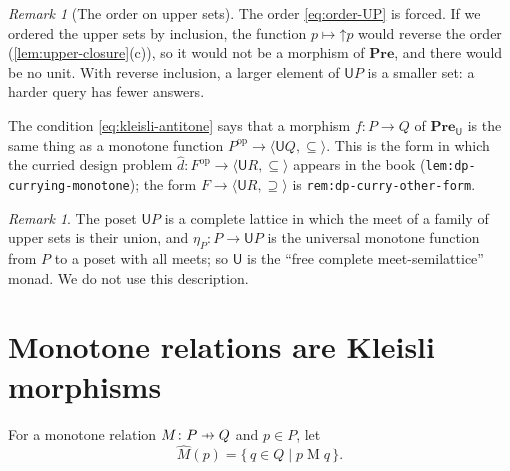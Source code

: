 \documentclass[11pt,a4paper]{article}
\theoremstyle{plain}
\theoremstyle{definition}
\theoremstyle{remark}
\newtheorem{remark}[theorem]{Remark}
\newcommand{\Cat}[1]{\mathbf{#1}}
\newcommand{\Pre}{\Cat{Pre}}
\newcommand{\U}{\mathsf{U}}
\newcommand{\PreU}{\Pre_{\U}}
\newcommand{\tup}[1]{\langle #1 \rangle}
\newcommand{\profto}{\mathrel{\ooalign{\hfil$\mapstochar\mkern 5mu$\hfil\cr$\to$\cr}}}
\newcommand{\rel}[3]{#1 \mathrel{#2} #3}
\newcommand{\up}{\mathord{\uparrow}}
\newcommand{\op}{^{\mathrm{op}}}
\newcommand{\lbl}[1]{\nolinkurl{#1}}
\begin{document}
\begin{remark}[The order on upper sets]
    \label{rem:order}
    The order \cref{eq:order-UP} is forced.
    If we ordered the upper sets by inclusion, the function $p \mapsto \up p$ would reverse the order (\cref{lem:upper-closure}(c)), so it would not be a morphism of $\Pre$, and there would be no unit.
    With reverse inclusion, a larger element of $\U P$ is a smaller set: a harder query has fewer answers.

    The condition \cref{eq:kleisli-antitone} says that a morphism $f \colon P \to Q$ of $\PreU$ is the same thing as a monotone function $P\op \to \tup{\U Q, \subseteq}$.
    This is the form in which the curried design problem $\widehat{d} \colon F\op \to \tup{\U R, \subseteq}$ appears in the book (\lbl{lem:dp-currying-monotone}); the form $F \to \tup{\U R, \supseteq}$ is \lbl{rem:dp-curry-other-form}.
\end{remark}

\begin{remark}
    The poset $\U P$ is a complete lattice in which the meet of a family of upper sets is their union, and $\eta_P \colon P \to \U P$ is the universal monotone function from $P$ to a poset with all meets; so $\U$ is the ``free complete meet-semilattice'' monad.
    We do not use this description.
\end{remark}

\section{Monotone relations are Kleisli morphisms}
\label{sec:mrel-kleisli}

For a monotone relation $M \colon P \profto Q$ and $p \in P$, let
\begin{equation}
    \label{eq:hat}
    \widehat{M}(p) = \{\, q \in Q \mid \rel{p}{M}{q} \,\}.
\end{equation}
\end{document}
